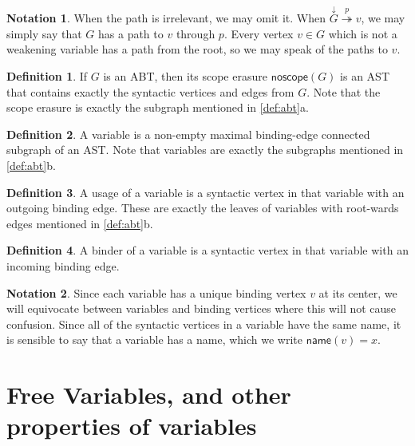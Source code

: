 \documentclass[11pt]{article} %
\theoremstyle{definition}
\newtheorem{dfn}{Definition}
\newtheorem*{ntn}{Notation}
\begin{document}
\begin{ntn}
When the path is irrelevant, we may omit it.
When $\overset{\downarrow}G \overset{p}\twoheadrightarrow v$, we may simply say that $G$ has a path to $v$ through $p$.
Every vertex $v \in G$ which is not a weakening variable has a path from the root, so we may speak of the paths to $v$.
\end{ntn}

\begin{dfn}
If $G$ is an ABT, then its scope erasure $\mathsf{noscope}(G)$ is an AST that contains exactly the syntactic vertices and edges from $G$.
Note that the scope erasure is exactly the subgraph mentioned in \cref{def:abt}a.
\end{dfn}

\begin{dfn}
A variable is a non-empty maximal binding-edge connected subgraph of an AST.
Note that variables are exactly the subgraphs mentioned in \cref{def:abt}b.
\end{dfn}

\begin{dfn}
A usage of a variable is a syntactic vertex in that variable with an outgoing binding edge.
These are exactly the leaves of variables with root-wards edges mentioned in \cref{def:abt}b.
\end{dfn}

\begin{dfn}
A binder of a variable is a syntactic vertex in that variable with an incoming binding edge.
\end{dfn}

\begin{ntn}
Since each variable has a unique binding vertex $v$ at its center, we will equivocate between variables and binding vertices where this will not cause confusion.
Since all of the syntactic vertices in a variable have the same name, it is sensible to say that a variable has a name, which we write $\mathsf{name}(v) = x$.
\end{ntn}

\section{Free Variables, and other properties of variables}
\end{document}
